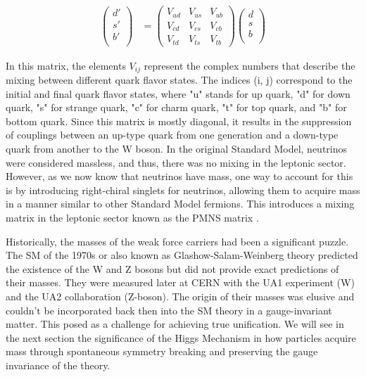 \begin{equation} 
\begin{align*}
\label{eq:CKMMatrix}
        \begin{pmatrix}
        d' \\
        s' \\
        b' \\
    \end{pmatrix} &=
    \begin{pmatrix}
         V_{ud} & V_{us} & V_{ub} \\
         V_{cd} & V_{cs} & V_{cb} \\
         V_{td} & V_{ts} & V_{tb}
    \end{pmatrix}
     \begin{pmatrix}
        d \\
        s \\
        b \\
    \end{pmatrix}
\end{align*}
\end{equation}

In this matrix, the elements $V_{ij}$ represent the complex numbers that describe the mixing between different quark flavor states. The indices (i, j) correspond to the initial and final quark flavor states, where "u" stands for up quark, "d" for down quark, "s" for strange quark, "c" for charm quark, "t" for top quark, and "b" for bottom quark. Since this matrix is mostly diagonal, it results in the suppression of couplings between an up-type quark from one generation and a down-type quark from another to the W boson. In the original Standard Model, neutrinos were considered massless, and thus, there was no mixing in the leptonic sector. However, as we now know that neutrinos have mass, one way to account for this is by introducing right-chiral singlets for neutrinos, allowing them to acquire mass in a manner similar to other Standard Model fermions. This introduces a mixing matrix in the leptonic sector known as the PMNS matrix \cite{Maki:1962mu}. 

Historically, the masses of the weak force carriers had been a significant puzzle. The SM of the 1970s or also known as Glashow-Salam-Weinberg theory predicted the existence of the W and Z bosons but did not provide exact predictions of their masses. They were measured later at CERN with the UA1 experiment (W) and the UA2 collaboration (Z-boson). The origin of their masses was elusive and couldn't be incorporated back then into the SM theory in a gauge-invariant matter. This posed as a challenge for achieving true unification. We will see in the next section the significance of the Higgs Mechanism in how particles acquire mass through spontaneous symmetry breaking and preserving the gauge invariance of the theory.



